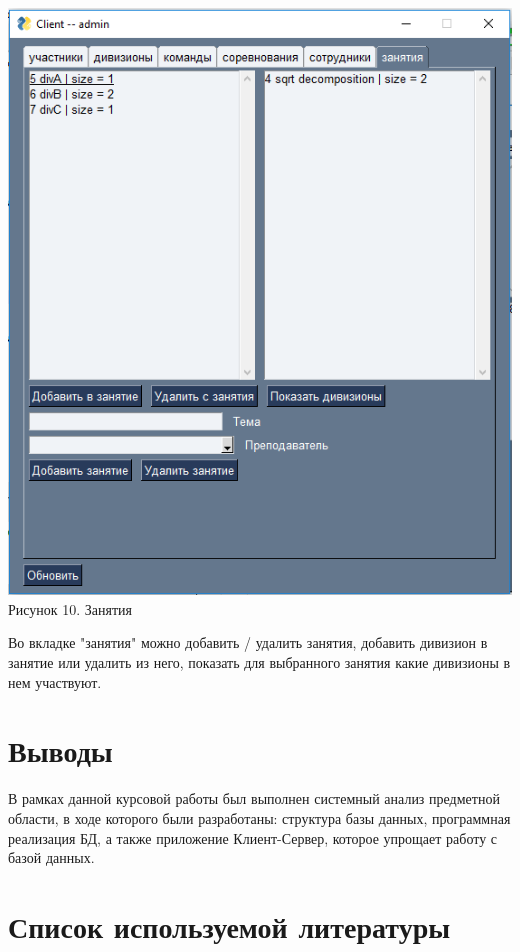 \documentclass[a4paper,12pt,preview]{report} %
\begin{document}
	
	\begin{center}
		\includegraphics{classes.PNG} \\
		Рисунок 10. Занятия
	\end{center}
	
	Во вкладке "занятия" можно добавить / удалить занятия, добавить дивизион в занятие или удалить из него, показать для выбранного занятия какие дивизионы в нем участвуют.
	
	
	\chapter{Выводы}
	
	В рамках данной курсовой работы был выполнен системный анализ предметной области, в ходе которого были разработаны: структура базы данных, программная реализация БД, а также приложение Клиент-Сервер, которое упрощает работу с базой данных.
	
	
	\chapter{Список используемой литературы}
	
\end{document}
